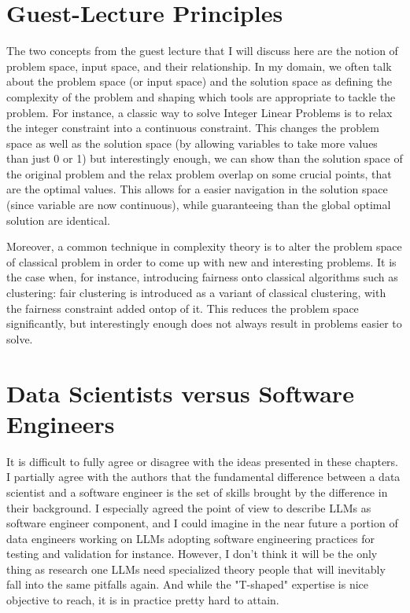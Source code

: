 \documentclass[11pt]{article}
\begin{document}
\section{Guest-Lecture Principles}

The two concepts from the guest lecture that I will discuss here are the notion of problem space, input space, and their relationship. In my domain, we often talk about the problem space (or input space) and the solution space as defining the complexity of the problem and shaping which tools are appropriate to tackle the problem. For instance, a classic way to solve Integer Linear Problems is to relax the integer constraint into a continuous constraint. This changes the problem space as well as the solution space (by allowing variables to take more values than just 0 or 1) but interestingly enough, we can show than the solution space of the original problem and the relax problem overlap on some crucial points, that are the optimal values. This allows for a easier navigation in the solution space (since variable are now continuous), while guaranteeing than the global optimal solution are identical.

\medskip

Moreover, a common technique in complexity theory is to alter the problem space of classical problem in order to come up with new and interesting problems. It is the case when, for instance, introducing fairness onto classical algorithms such as clustering: fair clustering is introduced as a variant of classical clustering, with the fairness constraint added ontop of it. This reduces the problem space significantly, but interestingly enough does not always result in problems easier to solve.

\section{Data Scientists versus Software Engineers}


It is difficult to fully agree or disagree with the ideas presented in these chapters. I partially agree with the authors that the fundamental difference between a data scientist and a software engineer is the set of skills brought by the difference in their background. I especially agreed the point of view to describe LLMs as software engineer component, and I could imagine in the near future a portion of data engineers working on LLMs adopting software engineering practices for testing and validation for instance. However, I don't think it will be the only thing as research one LLMs need specialized theory people that will inevitably fall into the same pitfalls again. And while the "T-shaped" expertise is nice objective to reach, it is in practice pretty hard to attain.
\end{document}
